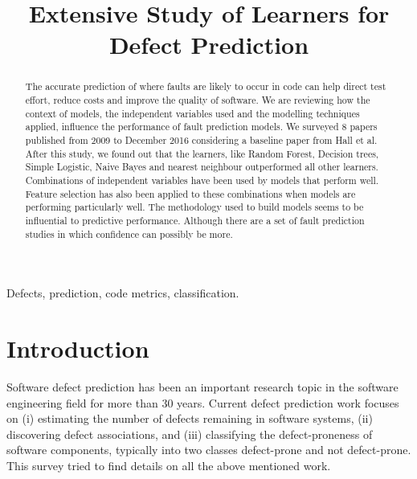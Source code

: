 \documentclass[conference]{IEEEtran}
\begin{document}
\pagestyle{plain}

\title{Extensive Study of Learners for Defect Prediction}

\author{
\and
{}
}

\maketitle

\begin{abstract}

The accurate prediction of where faults are likely to occur in code can help direct test effort, reduce costs and improve the quality of software. We are reviewing how the context of models, the independent variables used and the modelling techniques applied, influence the performance of fault prediction models. We surveyed 8 papers published from 2009 to December 2016 considering a baseline paper from Hall et al.~\cite{hall2012systematic} After this study, we found out that the learners, like Random Forest, Decision trees, Simple Logistic, Naive Bayes and nearest neighbour outperformed all other learners. Combinations of independent variables have been used by models that perform well. Feature selection has also been applied to these combinations when models are performing particularly well. The methodology used to build models seems to be influential to predictive performance. Although there are a set of fault
prediction studies in which confidence can possibly be more.
\end{abstract}

\begin{IEEEkeywords}
Defects, prediction, code metrics, classification.
\end{IEEEkeywords}

\IEEEpeerreviewmaketitle

\section{Introduction}
Software defect prediction has been an important research topic in the software engineering field for more than 30 years. Current defect prediction work focuses on (i) estimating the number of defects remaining in software systems, (ii) discovering defect associations, and (iii) classifying the defect-proneness of software components, typically into two classes defect-prone and not defect-prone. This survey tried to find details on all the above mentioned work. 
\end{document}
